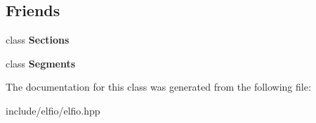 \subsection*{Friends}
\begin{DoxyCompactItemize}
\item 
class {\bfseries Sections}\hypertarget{class_e_l_f_i_o_1_1elfio_a39ef36e26adae019dc4cfc004b6eda26}{}\label{class_e_l_f_i_o_1_1elfio_a39ef36e26adae019dc4cfc004b6eda26}

\item 
class {\bfseries Segments}\hypertarget{class_e_l_f_i_o_1_1elfio_a6e4622c282e0b9215b2afb73df9aa032}{}\label{class_e_l_f_i_o_1_1elfio_a6e4622c282e0b9215b2afb73df9aa032}

\end{DoxyCompactItemize}


The documentation for this class was generated from the following file\+:\begin{DoxyCompactItemize}
\item 
include/elfio/elfio.\+hpp\end{DoxyCompactItemize}
